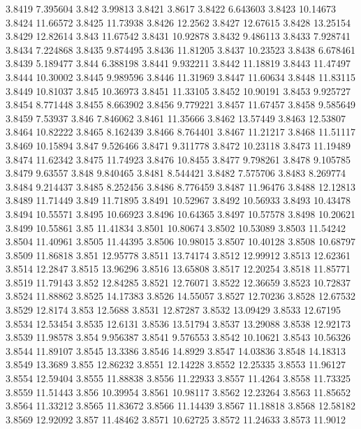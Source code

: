 3.8419  7.395604
3.842  3.99813
3.8421  3.8617
3.8422  6.643603
3.8423  10.14673
3.8424  11.66572
3.8425  11.73938
3.8426  12.2562
3.8427  12.67615
3.8428  13.25154
3.8429  12.82614
3.843  11.67542
3.8431  10.92878
3.8432  9.486113
3.8433  7.928741
3.8434  7.224868
3.8435  9.874495
3.8436  11.81205
3.8437  10.23523
3.8438  6.678461
3.8439  5.189477
3.844  6.388198
3.8441  9.932211
3.8442  11.18819
3.8443  11.47497
3.8444  10.30002
3.8445  9.989596
3.8446  11.31969
3.8447  11.60634
3.8448  11.83115
3.8449  10.81037
3.845  10.36973
3.8451  11.33105
3.8452  10.90191
3.8453  9.925727
3.8454  8.771448
3.8455  8.663902
3.8456  9.779221
3.8457  11.67457
3.8458  9.585649
3.8459  7.53937
3.846  7.846062
3.8461  11.35666
3.8462  13.57449
3.8463  12.53807
3.8464  10.82222
3.8465  8.162439
3.8466  8.764401
3.8467  11.21217
3.8468  11.51117
3.8469  10.15894
3.847  9.526466
3.8471  9.311778
3.8472  10.23118
3.8473  11.19489
3.8474  11.62342
3.8475  11.74923
3.8476  10.8455
3.8477  9.798261
3.8478  9.105785
3.8479  9.63557
3.848  9.840465
3.8481  8.544421
3.8482  7.575706
3.8483  8.269774
3.8484  9.214437
3.8485  8.252456
3.8486  8.776459
3.8487  11.96476
3.8488  12.12813
3.8489  11.71449
3.849  11.71895
3.8491  10.52967
3.8492  10.56933
3.8493  10.43478
3.8494  10.55571
3.8495  10.66923
3.8496  10.64365
3.8497  10.57578
3.8498  10.20621
3.8499  10.55861
3.85  11.41834
3.8501  10.80674
3.8502  10.53089
3.8503  11.54242
3.8504  11.40961
3.8505  11.44395
3.8506  10.98015
3.8507  10.40128
3.8508  10.68797
3.8509  11.86818
3.851  12.95778
3.8511  13.74174
3.8512  12.99912
3.8513  12.62361
3.8514  12.2847
3.8515  13.96296
3.8516  13.65808
3.8517  12.20254
3.8518  11.85771
3.8519  11.79143
3.852  12.84285
3.8521  12.76071
3.8522  12.36659
3.8523  10.72837
3.8524  11.88862
3.8525  14.17383
3.8526  14.55057
3.8527  12.70236
3.8528  12.67532
3.8529  12.8174
3.853  12.5688
3.8531  12.87287
3.8532  13.09429
3.8533  12.67195
3.8534  12.53454
3.8535  12.6131
3.8536  13.51794
3.8537  13.29088
3.8538  12.92173
3.8539  11.98578
3.854  9.956387
3.8541  9.576553
3.8542  10.10621
3.8543  10.56326
3.8544  11.89107
3.8545  13.3386
3.8546  14.8929
3.8547  14.03836
3.8548  14.18313
3.8549  13.3689
3.855  12.86232
3.8551  12.14228
3.8552  12.25335
3.8553  11.96127
3.8554  12.59404
3.8555  11.88838
3.8556  11.22933
3.8557  11.4264
3.8558  11.73325
3.8559  11.51443
3.856  10.39954
3.8561  10.98117
3.8562  12.23264
3.8563  11.85652
3.8564  11.33212
3.8565  11.83672
3.8566  11.14439
3.8567  11.18818
3.8568  12.58182
3.8569  12.92092
3.857  11.48462
3.8571  10.62725
3.8572  11.24633
3.8573  11.9012
